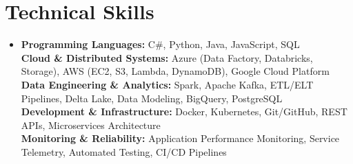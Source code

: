 \documentclass[letterpaper,11pt]{article}
\newcommand{\resumeSubHeadingListStart}{\begin{itemize}[leftmargin=0pt,label={},itemsep=-2pt]}
\newcommand{\resumeSubHeadingListEnd}{\end{itemize}}
\begin{document}
\section{Technical Skills}
 \resumeSubHeadingListStart
   \item \textbf{Programming Languages:} C\#, Python, Java, JavaScript, SQL \\
       \textbf{Cloud \& Distributed Systems:} Azure (Data Factory, Databricks, Storage), AWS (EC2, S3, Lambda, DynamoDB), Google Cloud Platform \\
       \textbf{Data Engineering \& Analytics:} Spark, Apache Kafka, ETL/ELT Pipelines, Delta Lake, Data Modeling, BigQuery, PostgreSQL \\
       \textbf{Development \& Infrastructure:} Docker, Kubernetes, Git/GitHub, REST APIs, Microservices Architecture \\
       \textbf{Monitoring \& Reliability:} Application Performance Monitoring, Service Telemetry, Automated Testing, CI/CD Pipelines
 \resumeSubHeadingListEnd

\end{document}
